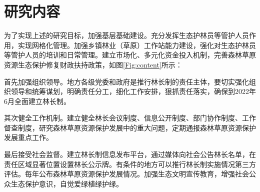 \section{研究内容}

为了实现上述的研究目标，加强基层基础建设。充分发挥生态护林员等管护人员作用，实现网格化管理。加强乡镇林业（草原）工作站能力建设，强化对生态护林员等管护人员的培训和日常管理。建立市场化、多元化资金投入机制，完善森林草原资源生态保护修复财政扶持政策，如图\ref{Fig:content}所示：

首先加强组织领导。地方各级党委和政府是推行林长制的责任主体，要切实强化组织领导和统筹谋划，明确责任分工，细化工作安排，狠抓责任落实，确保到2022年6月全面建立林长制。

其次健全工作机制。建立健全林长会议制度、信息公开制度、部门协作制度、工作督查制度，研究森林草原资源保护发展中的重大问题，定期通报森林草原资源保护发展重点工作。

最后接受社会监督。建立林长制信息发布平台，通过媒体向社会公告林长名单，在责任区域显著位置设置林长公示牌。有条件的地方可以推行林长制实施情况第三方评估。每年公布森林草原资源保护发展情况。加强生态文明宣传教育，增强社会公众生态保护意识，自觉爱绿植绿护绿。
